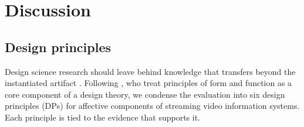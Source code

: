 \section{Discussion}\label{sec:discussion}

\subsection{Design principles}

Design science research should leave behind knowledge that transfers beyond the instantiated artifact \citep{hevner2004}. Following \citet{gregor2007}, who treat principles of form and function as a core component of a design theory, we condense the evaluation into six design principles (DPs) for affective components of streaming video information systems. Each principle is tied to the evidence that supports it.

